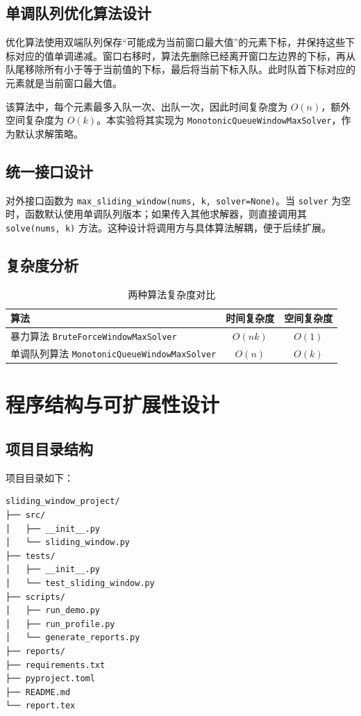 \documentclass[UTF8,a4paper,12pt]{ctexart}
\begin{document}
\subsection{单调队列优化算法设计}
优化算法使用双端队列保存“可能成为当前窗口最大值”的元素下标，并保持这些下标对应的值单调递减。窗口右移时，算法先删除已经离开窗口左边界的下标，再从队尾移除所有小于等于当前值的下标，最后将当前下标入队。此时队首下标对应的元素就是当前窗口最大值。

该算法中，每个元素最多入队一次、出队一次，因此时间复杂度为 \(O(n)\)，额外空间复杂度为 \(O(k)\)。本实验将其实现为 \texttt{MonotonicQueueWindowMaxSolver}，作为默认求解策略。

\subsection{统一接口设计}
对外接口函数为 \texttt{max\_sliding\_window(nums, k, solver=None)}。当 \texttt{solver} 为空时，函数默认使用单调队列版本；如果传入其他求解器，则直接调用其 \texttt{solve(nums, k)} 方法。这种设计将调用方与具体算法解耦，便于后续扩展。

\subsection{复杂度分析}
\begin{table}[h]
    \centering
    \begin{tabular}{>{\raggedright\arraybackslash}p{4.5cm}cc}
        \toprule
        算法 & 时间复杂度 & 空间复杂度 \\
        \midrule
        暴力算法 \texttt{BruteForceWindowMaxSolver} & \(O(nk)\) & \(O(1)\) \\
        单调队列算法 \texttt{MonotonicQueueWindowMaxSolver} & \(O(n)\) & \(O(k)\) \\
        \bottomrule
    \end{tabular}
    \caption{两种算法复杂度对比}
\end{table}

\section{程序结构与可扩展性设计}
\subsection{项目目录结构}
项目目录如下：

\begin{verbatim}
sliding_window_project/
├── src/
│   ├── __init__.py
│   └── sliding_window.py
├── tests/
│   ├── __init__.py
│   └── test_sliding_window.py
├── scripts/
│   ├── run_demo.py
│   ├── run_profile.py
│   └── generate_reports.py
├── reports/
├── requirements.txt
├── pyproject.toml
├── README.md
└── report.tex
\end{verbatim}
\end{document}
